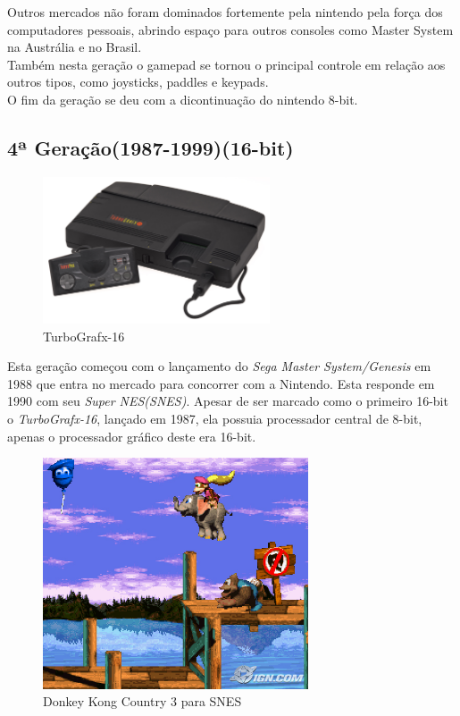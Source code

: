 \documentclass[paper=a4, fontsize=11pt]{scrartcl}	%
\numberwithin{equation}{section}															%
\numberwithin{figure}{section}																%
\numberwithin{table}{section}																%
\begin{document}
Outros mercados não foram dominados fortemente pela nintendo pela força dos computadores pessoais, abrindo espaço para outros consoles como Master System na Austrália e no Brasil.\\
Também nesta geração o gamepad se tornou o principal controle em relação aos outros tipos, como joysticks, paddles e keypads.\\
O fim da geração se deu com a dicontinuação do nintendo 8-bit.\\
\subsection{4ª Geração(1987-1999)(16-bit)}
\begin{figure}[h!]
	\centering
    \includegraphics[width=0.6\textwidth]{img/turbografx}
    \caption{TurboGrafx-16}
\end{figure}
Esta geração começou com o lançamento do \textit{Sega Master System/Genesis} em 1988 que entra no mercado para concorrer com a Nintendo. Esta responde em 1990 com seu \textit{Super NES(SNES)}. Apesar de ser marcado como o primeiro 16-bit o \textit{TurboGrafx-16}, lançado em 1987, ela possuia processador central de 8-bit, apenas o processador gráfico deste era 16-bit.\\
\begin{figure}[h!]
	\centering
    \includegraphics[width=0.7\textwidth]{img/dk3}
    \caption{Donkey Kong Country 3 para SNES}
\end{figure}
\end{document}
